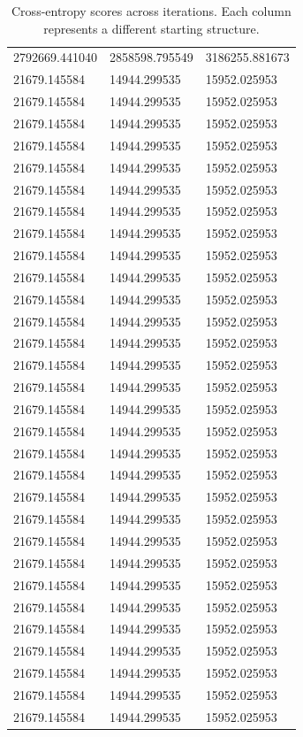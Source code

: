 \begin{table}\begin{tabular}{|l|l|l|}
\hline
2792669.441040&2858598.795549&3186255.881673\\
21679.145584&14944.299535&15952.025953\\
21679.145584&14944.299535&15952.025953\\
21679.145584&14944.299535&15952.025953\\
21679.145584&14944.299535&15952.025953\\
21679.145584&14944.299535&15952.025953\\
21679.145584&14944.299535&15952.025953\\
21679.145584&14944.299535&15952.025953\\
21679.145584&14944.299535&15952.025953\\
21679.145584&14944.299535&15952.025953\\
21679.145584&14944.299535&15952.025953\\
21679.145584&14944.299535&15952.025953\\
21679.145584&14944.299535&15952.025953\\
21679.145584&14944.299535&15952.025953\\
21679.145584&14944.299535&15952.025953\\
21679.145584&14944.299535&15952.025953\\
21679.145584&14944.299535&15952.025953\\
21679.145584&14944.299535&15952.025953\\
21679.145584&14944.299535&15952.025953\\
21679.145584&14944.299535&15952.025953\\
21679.145584&14944.299535&15952.025953\\
21679.145584&14944.299535&15952.025953\\
21679.145584&14944.299535&15952.025953\\
21679.145584&14944.299535&15952.025953\\
21679.145584&14944.299535&15952.025953\\
21679.145584&14944.299535&15952.025953\\
21679.145584&14944.299535&15952.025953\\
21679.145584&14944.299535&15952.025953\\
21679.145584&14944.299535&15952.025953\\
21679.145584&14944.299535&15952.025953\\
21679.145584&14944.299535&15952.025953\\
\hline
\end{tabular}\caption{
  Cross-entropy scores across iterations. Each column represents a different starting structure.}\end{table}

